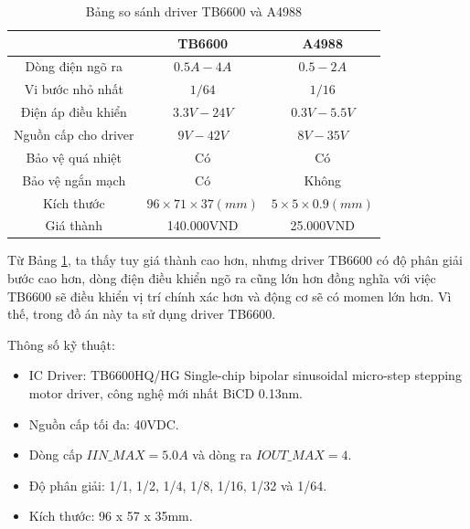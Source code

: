 \begin{table}
\centering
\begin{tabular}{|c|c|c|}
\hline 
 & TB6600 & A4988 \\ 
\hline 
Dòng điện ngõ ra & $ 0.5A-4A $ & $ 0.5 - 2A $ \\ 
\hline 
Vi bước nhỏ nhất & $ 1/64 $ & $ 1/16 $ \\ 
\hline 
Điện áp điều khiển & $ 3.3V - 24V $ & $ 0.3V - 5.5V $ \\ 
\hline 
Nguồn cấp cho driver & $ 9V - 42V $ & $ 8V - 35V $ \\ 
\hline 
Bảo vệ quá nhiệt & Có & Có \\ 
\hline 
Bảo vệ ngắn mạch & Có & Không \\ 
\hline 
Kích thước & $ 96 \times 71 \times 37 (mm) $ & $ 5 \times 5 \times 0.9 (mm) $ \\ 
\hline 
Giá thành & 140.000VND & 25.000VND \\ 
\hline 
\end{tabular} 
\caption{Bảng so sánh driver TB6600 và A4988}
\label{tab:sosanhdriver}
\end{table}

Từ Bảng \ref{tab:sosanhdriver}, ta thấy tuy giá thành cao hơn, nhưng driver TB6600 có độ phân giải bước cao hơn, dòng điện điều khiển ngõ ra cũng lớn hơn đồng nghĩa với việc TB6600 sẽ điều khiển vị trí chính xác hơn và động cơ sẽ có momen lớn hơn. Vì thế, trong đồ án này ta sử dụng driver TB6600.

Thông số kỹ thuật:
\begin{itemize}
\item IC Driver: TB6600HQ/HG Single-chip bipolar sinusoidal micro-step stepping motor driver, công nghệ mới nhất BiCD 0.13nm.
\item Nguồn cấp tối đa: 40VDC.
\item Dòng cấp $IIN\_MAX = 5.0A$ và  dòng ra $IOUT\_MAX = 4$.
\item Độ phân giải: 1/1, 1/2, 1/4, 1/8, 1/16, 1/32 và 1/64.
\item Kích thước: 96 x 57 x 35mm.
\end{itemize}

